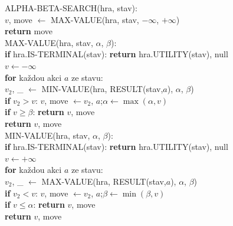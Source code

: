 \begin{algo}
\ttfamily\small
ALPHA-BETA-SEARCH(hra, stav):\\
\hspace*{1.5em}$v$, move $\leftarrow$ MAX-VALUE(hra, stav, $-\infty$, $+\infty$)\\
\hspace*{1.5em}\textbf{return} move\\[3pt]
MAX-VALUE(hra, stav, $\alpha$, $\beta$):\\
\hspace*{1.5em}\textbf{if} hra.IS-TERMINAL(stav): \textbf{return} hra.UTILITY(stav), null\\
\hspace*{1.5em}$v \leftarrow -\infty$\\
\hspace*{1.5em}\textbf{for} každou akci $a$ ze stavu:\\
\hspace*{3em}$v_2$, \_ $\leftarrow$ MIN-VALUE(hra, RESULT(stav,$a$), $\alpha$, $\beta$)\\
\hspace*{3em}\textbf{if} $v_2 > v$: $v$, move $\leftarrow v_2$, $a$;\quad $\alpha \leftarrow \max(\alpha, v)$\\
\hspace*{3em}\textbf{if} $v \ge \beta$: \textbf{return} $v$, move \\
\hspace*{1.5em}\textbf{return} $v$, move\\[3pt]
MIN-VALUE(hra, stav, $\alpha$, $\beta$):\\
\hspace*{1.5em}\textbf{if} hra.IS-TERMINAL(stav): \textbf{return} hra.UTILITY(stav), null\\
\hspace*{1.5em}$v \leftarrow +\infty$\\
\hspace*{1.5em}\textbf{for} každou akci $a$ ze stavu:\\
\hspace*{3em}$v_2$, \_ $\leftarrow$ MAX-VALUE(hra, RESULT(stav,$a$), $\alpha$, $\beta$)\\
\hspace*{3em}\textbf{if} $v_2 < v$: $v$, move $\leftarrow v_2$, $a$;\quad $\beta \leftarrow \min(\beta, v)$\\
\hspace*{3em}\textbf{if} $v \le \alpha$: \textbf{return} $v$, move \\
\hspace*{1.5em}\textbf{return} $v$, move
\end{algo}

